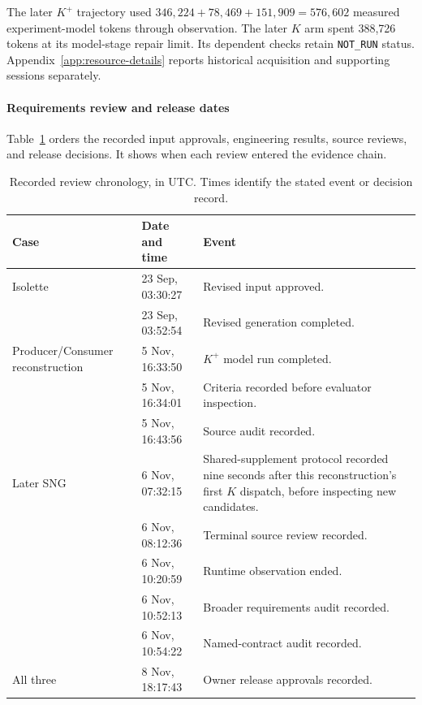 The later $K^{+}$ trajectory used $346{,}224+78{,}469+151{,}909=576{,}602$ measured experiment-model tokens through observation. The later $K$ arm spent 388,726 tokens at its model-stage repair limit. Its dependent checks retain \texttt{NOT\_RUN} status. Appendix~\ref{app:resource-details} reports historical acquisition and supporting sessions separately.

\paragraph{Requirements review and release dates}
Table~\ref{tab:review-chronology} orders the recorded input approvals, engineering results, source reviews, and release decisions. It shows when each review entered the evidence chain.

\begin{table}[!htbp]
\caption{Recorded review chronology, in UTC. Times identify the stated event or decision record.}
\label{tab:review-chronology}
\centering\small
\begin{tabular}{@{}p{.20\linewidth}p{.28\linewidth}p{.47\linewidth}@{}}
\hline
Case & Date and time & Event \\
\hline
Isolette & 23 Sep, 03:30:27 & Revised input approved. \\
 & 23 Sep, 03:52:54 & Revised generation completed. \\
Producer/\allowbreak{}Consumer reconstruction & 5 Nov, 16:33:50 & $K^{+}$ model run completed. \\
 & 5 Nov, 16:34:01 & Criteria recorded before evaluator inspection. \\
 & 5 Nov, 16:43:56 & Source audit recorded. \\
Later SNG & 6 Nov, 07:32:15 & Shared-supplement protocol recorded nine seconds after this reconstruction's first $K$ dispatch, before inspecting new candidates. \\
 & 6 Nov, 08:12:36 & Terminal source review recorded. \\
 & 6 Nov, 10:20:59 & Runtime observation ended. \\
 & 6 Nov, 10:52:13 & Broader requirements audit recorded. \\
 & 6 Nov, 10:54:22 & Named-contract audit recorded. \\
All three & 8 Nov, 18:17:43 & Owner release approvals recorded. \\
\hline
\end{tabular}
\end{table}

